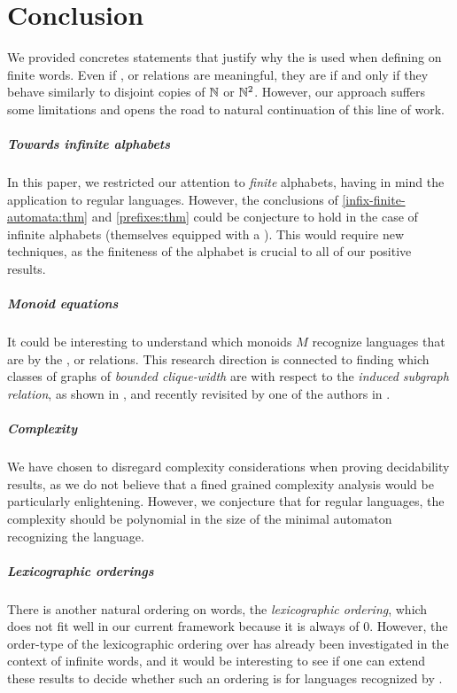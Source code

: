 \section{Conclusion}
\label{conclusion:sec}

We provided concretes statements that justify why the 
is used when defining  on finite words. Even if
,  or  relations are meaningful, they are
 if and only if they behave similarly to disjoint copies
of $\mathbb{N}$ or $\mathbb{N}^2$. However, our approach suffers some limitations 
and opens the road to natural continuation of this line of work.

\subparagraph{Towards infinite alphabets} In this paper, we restricted our
attention to \emph{finite} alphabets, having in mind the application to regular
languages. However, the conclusions of \cref{infix-finite-automata:thm} and
\cref{prefixes:thm} could be conjecture to hold in the case of infinite
alphabets (themselves equipped with a ). This would
require new techniques, as the finiteness of the alphabet is crucial to all of
our positive results.

\subparagraph{Monoid equations}  It could be interesting to understand which
monoids $M$ recognize languages that are  by the
,  or  relations. This research direction is
connected to finding which classes of graphs of \emph{bounded clique-width} are
 with respect to the \emph{induced subgraph relation},
as shown in \cite{DRT10}, and recently revisited by one of the authors in
\cite{L24:arxiv:v2}.

\subparagraph{Complexity} We have chosen to disregard complexity considerations
when proving decidability results, as we do not believe that a fined grained
complexity analysis would be particularly enlightening. However, we conjecture
that for regular languages, the complexity should be polynomial in the size of
the minimal automaton recognizing the language.


\subparagraph{Lexicographic orderings} There is another natural ordering on
words, the \emph{lexicographic ordering}, which does not fit well in our
current framework because it is always of  $0$. However, the
order-type of the lexicographic ordering over  has
already been investigated in the context of infinite words, and it would be
interesting to see if one can extend these results to decide whether such an
ordering is  for languages recognized by . 
